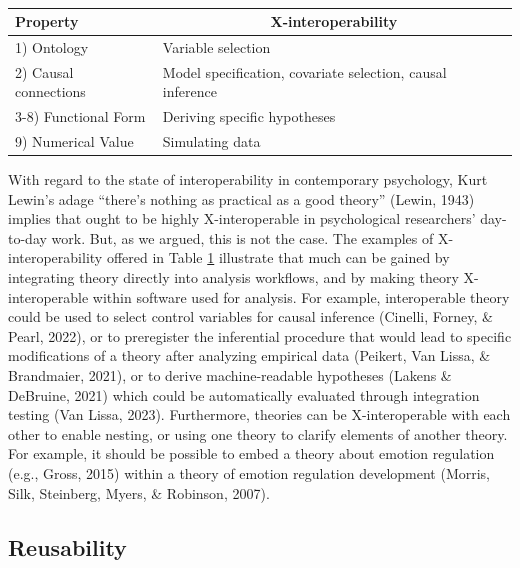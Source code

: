 \documentclass[
  man,floatsintext]{apa6}
\begin{document}
\begin{table}[tbp]

\begin{center}
\begin{threeparttable}

\caption{\label{tab:tabmeehl}}

\begin{tabular}{ll}
\toprule
Property & \multicolumn{1}{c}{X-interoperability}\\
\midrule
1) Ontology & Variable selection\\
2) Causal connections & Model specification, covariate selection, causal inference\\
3-8) Functional Form & Deriving specific hypotheses\\
9) Numerical Value & Simulating data\\
\bottomrule
\end{tabular}

\end{threeparttable}
\end{center}

\end{table}

With regard to the state of interoperability in contemporary psychology,
Kurt Lewin's adage ``there's nothing as practical as a good theory'' (Lewin, 1943) implies that ought to be highly X-interoperable in psychological researchers' day-to-day work.
But, as we argued, this is not the case.
The examples of X-interoperability offered in Table \ref{tab:tabmeehl} illustrate that much can be gained by integrating theory directly into analysis workflows, and by making theory X-interoperable within software used for analysis.
For example, interoperable theory could be used
to select control variables for causal inference (Cinelli, Forney, \& Pearl, 2022),
or to preregister the inferential procedure that would lead to specific modifications of a theory after analyzing empirical data (Peikert, Van Lissa, \& Brandmaier, 2021),
or to derive machine-readable hypotheses (Lakens \& DeBruine, 2021) which could be automatically evaluated through integration testing (Van Lissa, 2023).
Furthermore, theories can be X-interoperable with each other to enable nesting, or using one theory to clarify elements of another theory.
For example, it should be possible to embed a theory about emotion regulation (e.g., Gross, 2015) within a theory of emotion regulation development (Morris, Silk, Steinberg, Myers, \& Robinson, 2007).

\subsection{Reusability}\label{reusability}
\end{document}
